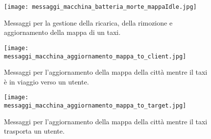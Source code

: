 \begin{figure}[htbp]
	\centering
	\texttt{[image: messaggi\_macchina\_batteria\_morte\_mappaIdle.jpg]}
	\caption{Messaggi per la gestione della ricarica, della rimozione e aggiornamento della mappa di un taxi.}
	\label{fig:messaggi_macchina_batteria_morte_mappaIdle}
\end{figure}

\begin{figure}[htbp]
	\centering
	\texttt{[image: messaggi\_macchina\_aggiornamento\_mappa\_to\_client.jpg]}
	\caption{Messaggi per l'aggiornamento della mappa della città mentre il taxi è in viaggio verso un utente.}
	\label{fig:messaggi_macchina_aggiornamento_mappa_to_client}
\end{figure}

\begin{figure}[htbp]
	\centering
	\texttt{[image: messaggi\_macchina\_aggiornamento\_mappa\_to\_target.jpg]}
	\caption{Messaggi per l'aggiornamento della mappa della città mentre il taxi trasporta un utente.}
	\label{fig:messaggi_macchina_aggiornamento_mappa_to_target}
\end{figure}
